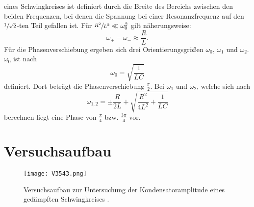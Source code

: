 \documentclass[
  bibliography=totoc,     %
  captions=tableheading,  %
  titlepage=firstiscover, %
]{scrartcl}
\begin{document}
eines Schwingkreises ist definiert durch die Breite des Bereichs zwischen den
beiden Frequenzen, bei denen die Spannung bei einer Resonanzfrequenz auf den
$\sfrac{1}{\sqrt{2}}$-ten Teil gefallen ist. Für $\sfrac{R^2}{L^2}\ll\omega_0^2$
gilt näherungsweise:
\begin{equation}
    \omega_+-\omega_-\approx\frac{R}{L}.
    \label{eqn:breite}
\end{equation}
Für die Phasenverschiebung ergeben sich drei Orientierungsgrößen $\omega_0$, $\omega_1$
und $\omega_2$.
$\omega_0$ ist nach
\begin{equation}
  \omega_0 = \sqrt{\frac{1}{LC}}
  \label{eqn:phasepi2}
\end{equation}
definiert. Dort beträgt die Phasenverschiebung $\frac{\pi}{2}$.
Bei $\omega_1$ und $\omega_2$, welche sich nach
\begin{equation}
  \omega_{1,2} = \pm \frac{R}{2L} + \sqrt{\frac{R^2}{4L^2}+\frac{1}{LC}}
  \label{eqn:phase134pi}
\end{equation}
berechnen liegt eine Phase von $\frac{\pi}{4}$ bzw. $\frac{3\pi}{4}$ vor.
\clearpage
\section{Versuchsaufbau}
\label{sec:versuchsaufbau}
\begin{figure}[htb]
  \centering
  \texttt{[image: V3543.png]}
  \caption{Versuchsaufbau zur Untersuchung der Kondensatoramplitude eines gedämpften Schwingkreises \cite{anleitung}.}
  \label{fig:V3543}
\end{figure}
\end{document}
